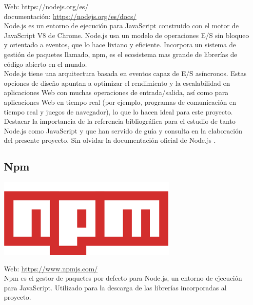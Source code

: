 Web: \url{https://nodejs.org/es/}\\
documentación: \url{https://nodejs.org/es/docs/}\cite{website:4}\\

Node.js es un entorno de ejecución para JavaScript construido con el motor de JavaScript V8 de Chrome. Node.js usa un modelo de operaciones E/S sin bloqueo y orientado a eventos, que lo hace liviano y eficiente. Incorpora un sistema de gestión de paquetes llamado, npm, es el ecosistema mas grande de librerías de código abierto en el mundo.\\

Node.js tiene una arquitectura basada en eventos capaz de E/S asíncronos. Estas opciones de diseño apuntan a optimizar el rendimiento y la escalabilidad en aplicaciones Web con muchas operaciones de entrada/salida, así como para aplicaciones Web en tiempo real (por ejemplo, programas de comunicación en tiempo real y juegos de navegador), lo que lo hacen ideal para este proyecto.\\

Destacar la importancia de la referencia bibliográfica \cite{book:javascript} para el estudio de tanto Node.js como JavaScript y que han servido de guía y consulta en la elaboración del presente proyecto. 
Sin olvidar la documentación oficial de Node.js \cite{website:4}.\\

\subsection{Npm}

\begin{center}
\includegraphics[scale=0.4]{imagenes/npm-logo.png}
\end{center}

Web: \url{https://www.npmjs.com/}\\

Npm es el gestor de paquetes por defecto para Node.js, un entorno de ejecución para JavaScript. Utilizado para la descarga de las librerías incorporadas al proyecto.


